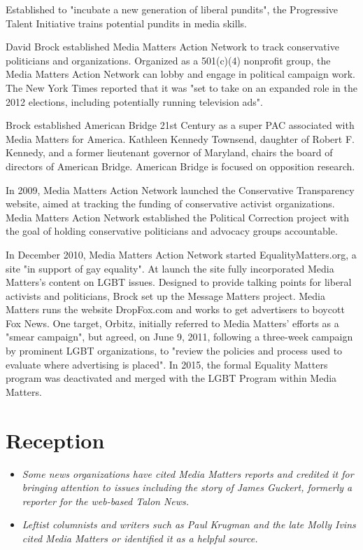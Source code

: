 Established to "incubate a new generation of liberal pundits", the
Progressive Talent Initiative trains potential pundits in media skills.

David Brock established Media Matters Action Network to track
conservative politicians and organizations. Organized as a 501(c)(4)
nonprofit group, the Media Matters Action Network can lobby and engage
in political campaign work. The New York Times reported that it was "set
to take on an expanded role in the 2012 elections, including potentially
running television ads".

Brock established American Bridge 21st Century as a super PAC associated
with Media Matters for America. Kathleen Kennedy Townsend, daughter of
Robert F. Kennedy, and a former lieutenant governor of Maryland, chairs
the board of directors of American Bridge. American Bridge is focused on
opposition research.

In 2009, Media Matters Action Network launched the Conservative
Transparency website, aimed at tracking the funding of conservative
activist organizations. Media Matters Action Network established the
Political Correction project with the goal of holding conservative
politicians and advocacy groups accountable.

In December 2010, Media Matters Action Network started
EqualityMatters.org, a site "in support of gay equality". At launch the
site fully incorporated Media Matters's content on LGBT issues. Designed
to provide talking points for liberal activists and politicians, Brock
set up the Message Matters project. Media Matters runs the website
DropFox.com and works to get advertisers to boycott Fox News. One
target, Orbitz, initially referred to Media Matters' efforts as a "smear
campaign", but agreed, on June 9, 2011, following a three-week campaign
by prominent LGBT organizations, to "review the policies and process
used to evaluate where advertising is placed". In 2015, the formal
Equality Matters program was deactivated and merged with the LGBT
Program within Media Matters.

\section{Reception}\label{reception}

\begin{itemize}
\item
  \emph{Some news organizations have cited Media Matters reports and
  credited it for bringing attention to issues including the story of
  James Guckert, formerly a reporter for the web-based Talon News.}
\item
  \emph{Leftist columnists and writers such as Paul Krugman and the late
  Molly Ivins cited Media Matters or identified it as a helpful source.}
\end{itemize}

